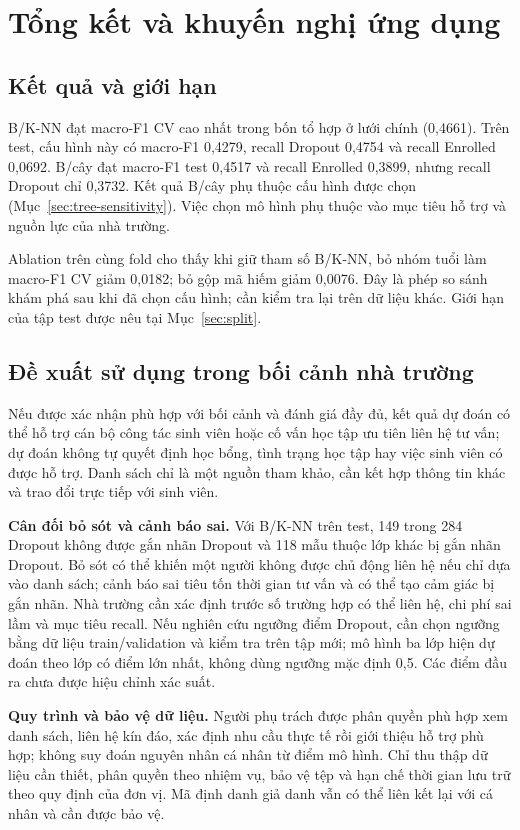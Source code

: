 \chapter{Tổng kết và khuyến nghị ứng dụng}

\section{Kết quả và giới hạn}
B/K-NN đạt macro-F1 CV cao nhất trong bốn tổ hợp ở lưới chính (0,4661). Trên test, cấu hình này có macro-F1 0,4279, recall Dropout 0,4754 và recall Enrolled 0,0692. B/cây đạt macro-F1 test 0,4517 và recall Enrolled 0,3899, nhưng recall Dropout chỉ 0,3732. Kết quả B/cây phụ thuộc cấu hình được chọn (Mục~\ref{sec:tree-sensitivity}). Việc chọn mô hình phụ thuộc vào mục tiêu hỗ trợ và nguồn lực của nhà trường.

Ablation trên cùng fold cho thấy khi giữ tham số B/K-NN, bỏ nhóm tuổi làm macro-F1 CV giảm 0,0182; bỏ gộp mã hiếm giảm 0,0076. Đây là phép so sánh khám phá sau khi đã chọn cấu hình; cần kiểm tra lại trên dữ liệu khác. Giới hạn của tập test được nêu tại Mục~\ref{sec:split}.

\section{Đề xuất sử dụng trong bối cảnh nhà trường}
Nếu được xác nhận phù hợp với bối cảnh và đánh giá đầy đủ, kết quả dự đoán có thể hỗ trợ cán bộ công tác sinh viên hoặc cố vấn học tập ưu tiên liên hệ tư vấn; dự đoán không tự quyết định học bổng, tình trạng học tập hay việc sinh viên có được hỗ trợ. Danh sách chỉ là một nguồn tham khảo, cần kết hợp thông tin khác và trao đổi trực tiếp với sinh viên.

\textbf{Cân đối bỏ sót và cảnh báo sai.} Với B/K-NN trên test, 149 trong 284 Dropout không được gắn nhãn Dropout và 118 mẫu thuộc lớp khác bị gắn nhãn Dropout. Bỏ sót có thể khiến một người không được chủ động liên hệ nếu chỉ dựa vào danh sách; cảnh báo sai tiêu tốn thời gian tư vấn và có thể tạo cảm giác bị gắn nhãn. Nhà trường cần xác định trước số trường hợp có thể liên hệ, chi phí sai lầm và mục tiêu recall. Nếu nghiên cứu ngưỡng điểm Dropout, cần chọn ngưỡng bằng dữ liệu train/validation và kiểm tra trên tập mới; mô hình ba lớp hiện dự đoán theo lớp có điểm lớn nhất, không dùng ngưỡng mặc định 0,5. Các điểm đầu ra chưa được hiệu chỉnh xác suất.

\textbf{Quy trình và bảo vệ dữ liệu.} Người phụ trách được phân quyền phù hợp xem danh sách, liên hệ kín đáo, xác định nhu cầu thực tế rồi giới thiệu hỗ trợ phù hợp; không suy đoán nguyên nhân cá nhân từ điểm mô hình. Chỉ thu thập dữ liệu cần thiết, phân quyền theo nhiệm vụ, bảo vệ tệp và hạn chế thời gian lưu trữ theo quy định của đơn vị. Mã định danh giả danh vẫn có thể liên kết lại với cá nhân và cần được bảo vệ.

